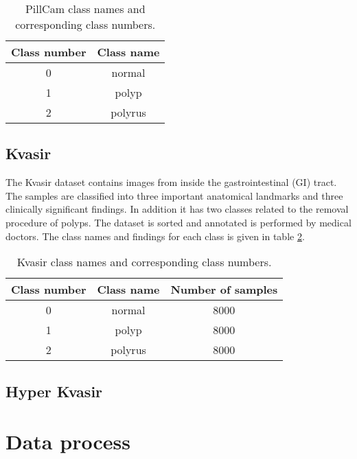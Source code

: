 \documentclass[thesis.tex]{subfiles}
\begin{document}
\begin{table}
  \centering
  \begin{tabular}{ |c|c| }
  	\hline
  	Class number & Class name \\
    \hline
    0 & normal \\ 
    1 & polyp \\ 
    2 & polyrus \\ 
    \hline
  \end{tabular}
  \caption{PillCam class names and corresponding class numbers.}
  \label{table:kvasir_pillcam}
\end{table}


\subsection{Kvasir} \label{kvasir}
The Kvasir dataset \cite{KVASIRMultiClass17} contains images from inside the gastrointestinal (GI) tract. The samples are classified into three important anatomical landmarks and three clinically significant findings. In addition it has two classes related to the removal procedure of polyps. The dataset is sorted and annotated is performed by medical doctors. The class names and findings for each class is given in table \ref{table:kvasir}.

\begin{table}
  \centering
  \begin{tabular}{ |c|c|c| }
  	\hline
  	Class number & Class name & Number of samples \\
    \hline
    0 & normal & 8000 \\ 
    1 & polyp & 8000 \\ 
    2 & polyrus & 8000 \\ 
    \hline
  \end{tabular}
  \caption{Kvasir class names and corresponding class numbers.}
  \label{table:kvasir}
\end{table}


\subsection{Hyper Kvasir} \label{hyper_kvasir}



\section{Data process} \label{data_pipeline}
\end{document}
